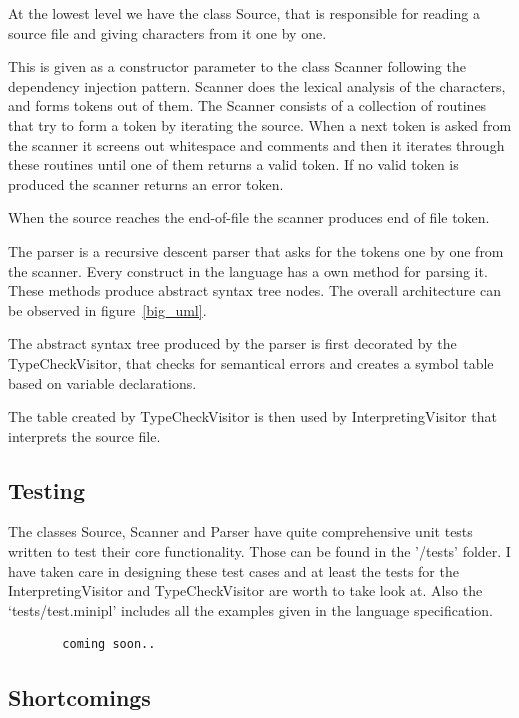 \documentclass[12pt,a4paper]{article}
\begin{document}
At the lowest level we have the class Source, that is responsible
for reading a source file and giving characters from it one by one.

This is given as a constructor parameter to the class Scanner following
the dependency injection pattern. Scanner
does the lexical analysis of the characters, and forms tokens out
of them. The Scanner consists of a collection of routines that
try to form a token by iterating the source. When a next
token is asked from the scanner it screens out whitespace and
comments and then it iterates through these
routines until one of them returns a valid token. If no
valid token is produced the scanner returns an error token.

When the source reaches the end-of-file the scanner produces
end of file token.

The parser is a recursive descent parser that asks for the tokens
one by one from the scanner. Every construct in the language has
a own method for parsing it. These methods produce abstract syntax 
tree nodes. The overall architecture can be observed in figure~\ref{big_uml}.

The abstract syntax tree produced by the parser
is first decorated by the TypeCheckVisitor, that
checks for semantical errors and creates a symbol table
based on variable declarations.

The table created by TypeCheckVisitor is then used by
InterpretingVisitor that interprets the source file.



\subsection{Testing}

The classes Source, Scanner and Parser have quite comprehensive
unit tests written to test their core functionality. Those
can be found in the '/tests' folder. I have taken care in 
designing these test cases and at least the tests for the
InterpretingVisitor and TypeCheckVisitor are worth to 
take look at.
Also the `tests/test.minipl' includes all the examples given
in the language specification.

\begin{figure}\label{codecov}
  \begin{verbatim}
  coming soon..
  \end{verbatim}
\end{figure}

\subsection{Shortcomings}
\end{document}

